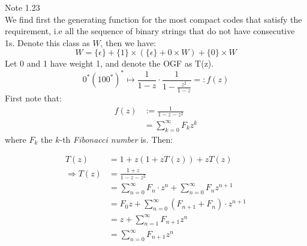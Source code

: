 \documentclass{article}
\newcommand{\mySum}[3]{\ensuremath{\sum_{#1 = #2}^{#3}}}
\begin{document}
  

Note 1.23\\
We find first the generating function for the most compact codes that satisfy the requirement, i.e all the sequence of binary strings that do not have consecutive 1s. Denote this class as $W$, then we have:\\
\[
	W = \{\epsilon\} + \{1\} \times (\{\epsilon\} + {0} \times W) + \{0\} \times W
\]
Let 0 and 1 have weight 1, and denote the OGF as T(z). 
\[0^*{(100^*)}^*  \mapsto \frac{1}{1-z} \cdot \frac{1}{1 - \frac{z^2}{1 - z}} =: f(z)\] 
First note that:
\begin{align*}
	f(z) &:= \frac{1}{1-z - z^2} \\
		&= \mySum{k}{0}{\infty} F_k z^k
\end{align*}  
where $F_k$ the $k$-th \emph{Fibonacci number} is.
Then:

\begin{align*}
	T(z) &= 1 + z(1+zT(z)) + zT(z)\\
	\Rightarrow T(z) &= \frac{1+z}{1-z-z^2} \\
					&= \mySum{n}{0}{\infty} F_n \cdot z^{n} + \mySum{n}{0}{\infty}F_n z^{n+1} \\
					&= F_0 z + \mySum{n}{0}{\infty} (F_{n+1} + F_n) \cdot z^{n+1} \\
					&= z + \mySum{n}{1}{\infty} F_{n+1} z^n \\
					&= \mySum{n}{0}{\infty} F_{n+1} z^n
\end{align*}
\end{document}
